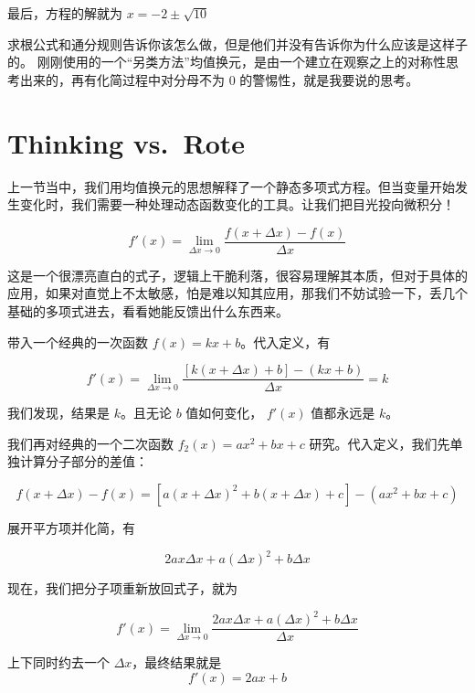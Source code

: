 最后，方程的解就为 \(x = -2 \pm \sqrt{10}\)

求根公式和通分规则告诉你该怎么做，但是他们并没有告诉你为什么应该是这样子的。
刚刚使用的一个“另类方法”均值换元，是由一个建立在观察之上的对称性思考出来的，再有化简过程中对分母不为 \(0\) 的警惕性，就是我要说的思考。

\section{Thinking vs.\ Rote}
上一节当中，我们用均值换元的思想解释了一个静态多项式方程。但当变量开始发生变化时，我们需要一种处理动态函数变化的工具。让我们把目光投向微积分！

\[
\boxed{f'(x)=\lim_{\Delta x\to 0}\frac{f(x+\Delta x)-f(x)}{\Delta x}}
\]

这是一个很漂亮直白的式子，逻辑上干脆利落，很容易理解其本质，但对于具体的应用，如果对直觉上不太敏感，怕是难以知其应用，那我们不妨试验一下，丢几个基础的多项式进去，看看她能反馈出什么东西来。

带入一个经典的一次函数 \(f(x) = kx + b\)。代入定义，有 

\[
f'(x) = \lim_{\Delta x \to 0} \frac{\left[ k(x + \Delta x) + b \right] - (kx + b)}{\Delta x} = k
\] 

我们发现，结果是 \(k\)。且无论 \(b\) 值如何变化， \(f'(x)\) 值都永远是 \(k\)。


我们再对经典的一个二次函数 \(f_2(x) = ax^2 + bx + c\) 研究。代入定义，我们先单独计算分子部分的差值：

\[
f(x + \Delta x) - f(x) = [a(x + \Delta x)^2 + b(x + \Delta x) + c] - (ax^2 + bx + c)
\]

展开平方项并化简，有

\[
2ax \Delta x + a(\Delta x)^2 + b\Delta x
\]

现在，我们把分子项重新放回式子，就为

\[
f'(x)=\lim_{\Delta x\to 0}\frac{2ax \Delta x + a(\Delta x)^2 + b\Delta x}{\Delta x}
\]

上下同时约去一个 $\Delta x$，最终结果就是
\[
f'(x) = 2ax + b
\] 

